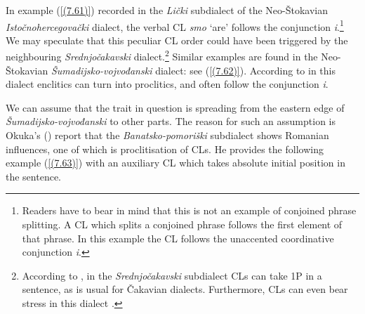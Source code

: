 
\noindent In example (\ref{(7.61)}) recorded in the \textit{Lički} subdialect of the Neo-Štokavian \textit{Istočnohercegovački} dialect, the verbal CL \textit{smo} ‘are’ follows the conjunction \textit{i}.\footnote{Readers have to bear in mind that this is not an example of conjoined phrase splitting. A CL which splits a conjoined phrase follows the first element of that phrase. In this example the CL follows the unaccented coordinative conjunction \textit{i}.} We may speculate that this peculiar CL order could have been triggered by the neighbouring \textit{Srednjočakavski} dialect.\footnote{According to \citet[113]{Lisac09}, in the \textit{Srednjočakavski} subdialect CLs can take 1P in a sentence, as is usual for Čakavian dialects. Furthermore, CLs can even bear stress in this dialect \citep[cf.][]{Lisac09}.} Similar examples are found in the Neo-Štokavian \textit{Šumadijsko-vojvođanski} dialect: see (\ref{(7.62)}). According to \citet[136]{Okuka08} in this dialect enclitics can turn into proclitics, and often follow the conjunction \textit{i}.


\noindent We can assume that the trait in question is spreading from the eastern edge of \textit{Šumadijsko-vojvođanski} to other parts. The reason for such an assumption is Okuka's (\citeyear[148]{Okuka08}) report that the \textit{Banatsko-pomoriški} subdialect shows Romanian influences, one of which is proclitisation of CLs. He provides the following example (\ref{(7.63)}) with an auxiliary CL which takes absolute initial position in the sentence.

